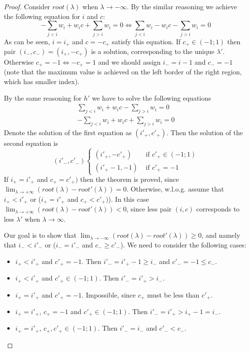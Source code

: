 \begin{proof}
	Consider $root(\lambda)$ when $\lambda \to -\infty$. By the similar reasoning we achieve the following equation for $i$ and $c$:
	\[-\sum\limits_{j < i} w_i + w_i c + \sum\limits_{j > i} w_i = 0
	\iff \sum\limits_{j < i} w_i - w_i c - \sum\limits_{j > i} w_i = 0 \]
	As can be seen, $i=i_+$ and $c=-c_+$ satisfy this equation.
	If $c_+ \in (-1; 1)$ then pair $(i_-, c_-) = (i_+, -c_+)$ is a solution, corresponding to the unique $\lambda'$.
	Otherwise $c_+=-1 \iff -c_+=1$ and we should assign $i_- = i-1$ and $c_-=-1$ (note that the maximum value is achieved on the left border of the right region, which has smaller index).
	
	By the same reasoning for $h'$ we have to solve the following equations
	\[
	\begin{aligned}
	\sum\limits_{j < i} w_i + w_i c - \sum\limits_{j > i} w_i = 0 \\
	-\sum\limits_{j < i} w_i + w_i c + \sum\limits_{j > i} w_i = 0
	\end{aligned}
	\]
	Denote the solution of the first equation as $(i'_+, c'_+)$.
	Then the solution of the second equation is
	\[
	(i'_-, c'_-)
	\begin{cases}
	(i'_+, -c'_+)  & \text{ if } c'_+ \in (-1; 1) \\
	(i'_+-1, -1)   & \text{ if } c'_+ = -1
	\end{cases}
	\]
	If $i_+ = i'_+$ and $c_+ = c'_+)$ then the theorem is proved, since $\lim_{\lambda \to +\infty}(root(\lambda) - root'(\lambda)) = 0$.
	Otherwise, w.l.o.g. assume that $i_+ < i'_+$ or ($i_+ = i'_+$ and $c_+ < c'_+)$).
	In this case $\lim_{\lambda \to +\infty}(root(\lambda) - root'(\lambda)) < 0$, since less pair $(i,c)$ corresponds to less $\lambda'$ when $\lambda \to \infty$.
	
	Our goal is to show that $\lim_{\lambda \to -\infty}(root(\lambda) - root'(\lambda)) \ge 0$, and namely that $i_- < i'_-$ or ($i_- = i'_-$ and $c_- \ge c'_-$).
	We need to consider the following cases:
	\begin{itemize}
		\item $i_+ < i'_+$ and $c'_+ = -1$. Then $i'_- = i'_+-1 \ge i_-$ and $c'_- = -1 \le c_-$.
		\item $i_+ < i'_+$ and $c'_+ \in (-1; 1)$. Then $i'_- = i'_+ > i_-$.
		\item $i_+ = i'_+$ and $c'_+ = -1$. Impossible, since $c_+$ must be less than $c'_+$.
		\item $i_+ = i'_+$, $c_+ = -1$ and $c'_+ \in (-1; 1)$. Then $i'_- = i'_+ > i_+-1 = i_-$.
		\item $i_+ = i'_+$, $c_+, c'_+ \in (-1; 1)$. Then $i'_- = i_-$ and $c'_- < c_-$.
	\end{itemize}
\end{proof}
